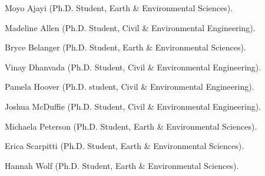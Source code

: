 \item Moyo Ajayi (Ph.D. Student, Earth \& Environmental Sciences).
\item Madeline Allen (Ph.D. Student, Civil \& Environmental Engineering).
\item Bryce Belanger (Ph.D. Student, Earth \& Environmental Sciences).
\item Vinay Dhanvada (Ph.D. Student, Civil \& Environmental Engineering).
\item Pamela Hoover (Ph.D. student, Civil \& Environmental Engineering).
\item Joshua McDuffie (Ph.D. Student, Civil \& Environmental Engineering).
\item Michaela Peterson (Ph.D. Student, Earth \& Environmental Sciences).
\item Erica Scarpitti (Ph.D. Student, Earth \& Environmental Sciences).
\item Hannah  Wolf (Ph.D. Student, Earth \& Environmental Sciences).